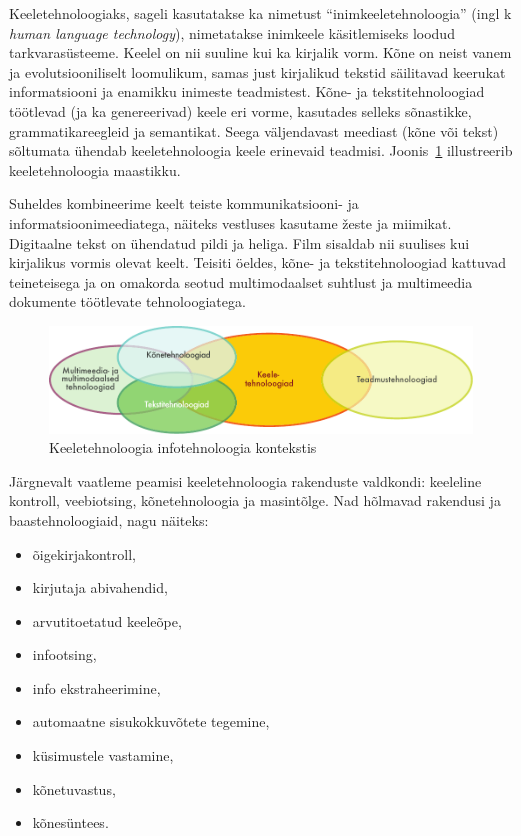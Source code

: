 \begin{multicols}{2}
Keeletehnoloogiaks, sageli kasutatakse ka nimetust ``inimkeeletehnoloogia'' (ingl k \textit{human language technology}), nimetatakse inimkeele käsitlemiseks loodud tarkvarasüsteeme.  Keelel on nii suuline kui ka kirjalik vorm.  Kõne on neist vanem ja evolutsiooniliselt loomulikum, samas just kirjalikud tekstid säilitavad keerukat informatsiooni ja enamikku inimeste teadmistest.  Kõne- ja tekstitehnoloogiad töötlevad (ja ka genereerivad) keele eri vorme, kasutades selleks sõnastikke, grammatikareegleid ja semantikat.  Seega väljendavast meediast (kõne või tekst) sõltumata ühendab keeletehnoloogia keele erinevaid teadmisi.  Joonis~\ref{fig:ltincontext_ee} illustreerib keeletehnoloogia maastikku.

Suheldes kombineerime keelt teiste kommunikat\-siooni- ja informatsioonimeediatega, näiteks vestluses kasutame žeste ja miimikat.  Digitaalne tekst on ühendatud pildi ja heliga.  Film sisaldab nii suulises kui kirjalikus vormis olevat keelt.  Teisiti öeldes, kõne- ja tekstitehnoloogiad kattuvad teineteisega ja on omakorda seotud multimodaalset suhtlust ja multimeedia dokumente töötlevate tehnoloogiatega.

\begin{figure}[htb]
  \center
  \includegraphics[width=\textwidth]{../_media/estonian/language_technologies}
  \caption{Keeletehnoloogia infotehnoloogia kontekstis}
  \label{fig:ltincontext_ee}
\end{figure}

Järgnevalt vaatleme peamisi keeletehnoloogia rakenduste valdkondi: keeleline kontroll, veebiotsing, kõnetehnoloogia ja masintõlge. Nad hõlmavad rakendusi ja baastehnoloogiaid, nagu näiteks:

\begin{itemize}
\item õigekirjakontroll,
\item kirjutaja abivahendid,
\item arvutitoetatud keeleõpe,
\item infootsing,
\item info ekstraheerimine,
\item automaatne sisukokkuvõtete tege\-mine,
\item küsimustele vastamine,
\item kõnetuvastus,
\item kõnesüntees.
\end{itemize}


\end{multicols}
